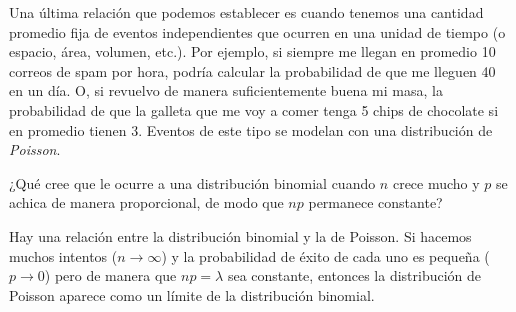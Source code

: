 Una última relación que podemos establecer es cuando tenemos una cantidad promedio fija de eventos independientes que ocurren en una unidad de tiempo (o espacio, área, volumen, etc.). Por ejemplo, si siempre me llegan en promedio 10 correos de spam por hora, podría calcular la probabilidad de que me lleguen 40 en un día. O, si revuelvo de manera suficientemente buena mi masa, la probabilidad de que la galleta que me voy a comer tenga 5 chips de chocolate si en promedio tienen 3. Eventos de este tipo se modelan con una distribución de \emph{Poisson}. 

\begin{pausa}
¿Qué cree que le ocurre a una distribución binomial cuando \(n\) crece mucho y \(p\) se achica de manera proporcional, de modo que \(np\) permanece constante?
\end{pausa}

Hay una relación entre la distribución binomial y la de Poisson. Si hacemos muchos intentos (\(n\to\infty\)) y la probabilidad de éxito de cada uno es pequeña (\(p\to0\)) pero de manera que \(np=\lambda\) sea constante, entonces la distribución de Poisson aparece como un límite de la distribución binomial.



